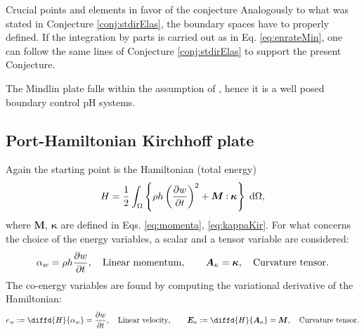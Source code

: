 \begin{conjecture}
\begin{paragraph}{Crucial points and elements in favor of the conjecture}
Analogously to what was stated in Conjecture \ref{conj:stdirElas}, the boundary spaces have to properly defined. If the integration by parts is carried out as in Eq. \eqref{eq:enrateMin}, one can follow the same lines of Conjecture \ref{conj:stdirElas} to support the present Conjecture.
\end{paragraph}

\end{conjecture}
The Mindlin plate falls within the assumption of \cite{skrepek2019wellposedness}, hence it is a well posed boundary control pH systems.
	

\subsection{Port-Hamiltonian Kirchhoff plate}\label{sec:pHkirchh}
Again the starting point is the Hamiltonian (total energy)
\begin{equation}
\label{eq:Hkir}
H = \frac{1}{2} \int_{\Omega} \left\{\rho h \left(\diffp{w}{t} \right)^2 + \bm{M} \cddot \bm{\kappa}  \right\}  \d{\Omega} ,
\end{equation}
where $\bm{M}, \ \bm{\kappa}$ are defined in Eqs. \eqref{eq:momenta}, \eqref{eq:kappaKir}. For what concerns the choice of the energy variables, a scalar and a tensor variable are considered:
\begin{equation}\label{eq:alpha_Kirchh}
\alpha_w = \rho h \diffp{w}{t}, \quad \text{Linear momentum}, \qquad \bm{A}_{\kappa} = \bm{\kappa}, \quad \text{Curvature tensor}.	\end{equation}
The co-energy variables are found by computing the variational derivative of the Hamiltonian:
\begin{equation}\label{eq:e_Kirchh}
e_w := \diffd{H}{\alpha_w} = \diffp{w}{t}, \quad \text{Linear velocity},  \qquad  \bm{E}_{\kappa} := \diffd{H}{\bm{A}_{\kappa}} = \bm{M}, \quad \text{Curvature tensor}.
\end{equation}

